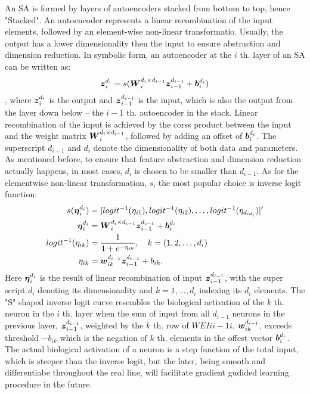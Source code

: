 An SA is formed by layers of autoencoders stacked from bottom to top, hence "Stacked". An autoencoder represents a linear recombination of the input elements, followed by an element-wise non-linear transformatio. Usually, the output has a lower dimensionality then the input to ensure abstraction and dimension reduction. In symbolic form, an autoencoder at the $i$ th. layer of an SA can be written as:
\begin{equation} \label{eq:AE}
  \begin{split}
    \boldsymbol{z}_i^{d_i}   &= s(\boldsymbol{W}_{i}^{d_{i} \times d_{i-1}} {\boldsymbol{z}_{i-1}^{d_{i-1}}} + \boldsymbol{b}_{i}^{d_{i}}) \\
  \end{split}
\end{equation},
where ${\boldsymbol{z}_{i}^{d_{i}}}$ is the output and ${\boldsymbol{z}_{i-1}^{d_{i-1}}}$ is the input, which is also the output from the layer down below -- the $i-1$ th. autoencoder in the stack. Linear recombination of the input is achieved by the corss product between the input and the weight matrix $\boldsymbol{W}_{i}^{d_{i} \times d_{i-1}}$, followed by adding an offset of $\boldsymbol{b}_{i}^{d_{i}}$. The superscript $d_{i-1}$ and $d_i$ denote the dimensionality of both data and parameters. As mentioned before, to ensure that feature abstraction and dimension reduction actually happens, in most cases, $d_i$ is chosen to be smaller than $d_{i-1}$. As for the elementwise non-linear transformation, $s$, the most popular choice is inverse logit function:
\begin{equation} \label{eq:InvLgt}
  \begin{split}
    s(\boldsymbol{\eta}_i^{d_i})     &= [logit^{-1}(\eta_{i1}), logit^{-1}(\eta_{i2}), \dots, logit^{-1}(\eta_{d_{id_i}})]^{\prime} \\
    \boldsymbol{\eta}_i^{d_i}        &= \boldsymbol{W}_{i}^{d_{i} \times d_{i-1}} {\boldsymbol{z}_{i-1}^{d_{i-1}}} + \boldsymbol{b}_{i}^{d_{i}} \\
    logit^{-1}(\eta_{ik}) &= \frac{1}{1+e^{-\eta_{ik}}}, \quad k=(1,2,\dots,d_i) \\
    \eta_{ik}             &= \boldsymbol{w}_{ik}^{d_{i-1}} {\boldsymbol{z}_{i-1}^{d_{i-1}}} + b_{ik}.
  \end{split}
\end{equation}
Here $\boldsymbol{\eta}_i^{d_i}$ is the result of linear recombination of input ${\boldsymbol{z}_{i-1}^{d_{i-1}}}$, with the super script $d_i$ denoting its dimensionality and $k = 1, \dots, d_i$ indexing its $d_i$ elements. The "S" shaped inverse logit curve resembles the biological activation of the $k$ th. neuron in the $i$ th. layer when the sum of input from all $d_{i-1}$ neurons in the previous layer, ${\boldsymbol{z}_{i-1}^{d_{i-1}}}$, weighted by the $k$ th. row of $WEI{i}{i-1}{i}$, $\boldsymbol{w}_{ik}^{d_{i-1}}$, exceeds threshold $-b_{ik}$ which is the negation of $k$ th. elements in the offest vector $\boldsymbol{b}_{i}^{d_{i}}$. The actual biological activation of a neuron is a step function of the total input, which is steeper than the inverse logit, but the later, being smooth and differentiabe throughout the real line, will facilitate gradient gudided learning procedure in the future.


